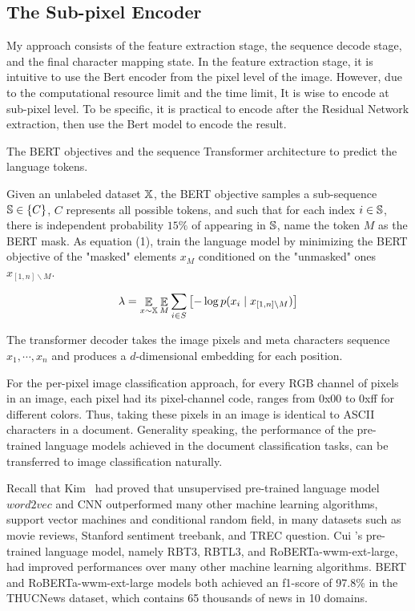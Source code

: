 \documentclass[review]{cvpr}
\begin{document}
\subsection{The Sub-pixel Encoder}

My approach consists of the feature extraction stage, the sequence decode stage, and the final character mapping state.
In the feature extraction stage, it is intuitive to use the Bert encoder from the pixel level of the image.
However, due to the computational resource limit and the time limit,
It is wise to encode at sub-pixel level.
To be specific, it is practical to encode after the Residual Network extraction, then use the Bert model to encode the result.

The BERT objectives and the sequence Transformer architecture to predict the language tokens.

\par Given an unlabeled dataset $\Bbb X$, the BERT objective samples a sub-sequence $\Bbb S \in \{C\}$,
$C$ represents all possible tokens, and such that for each index $i \in \Bbb S$,
there is independent probability $15\%$ of appearing in $\Bbb S$,
name the token $M$ as the BERT mask.
As equation (1), train the language model by minimizing the BERT objective of the "masked" elements $x_M$
conditioned on the "unmasked" ones $x_{\left[1,n\right]\backslash M}$.

\begin{equation}
  \lambda = \mathop{\Bbb E}\limits_{x\sim\Bbb X} \mathop{\Bbb E}\limits_{M} \sum_{i\in S}{\bigl[-\log{p(x_i\mid x_{\left[1,n \right]\backslash M})\bigr]}}
\end{equation}

\par The transformer decoder takes the image pixels and meta characters sequence $x_1,\cdots,x_n$ and produces a $d$-dimensional
embedding for each position.

For the per-pixel image classification approach, for every RGB channel of pixels in an image,
each pixel had its pixel-channel code, ranges from 0x00 to 0xff for different colors.
Thus, taking these pixels in an image is identical to ASCII characters in a document.
Generality speaking, the performance of the pre-trained language models achieved in the document classification tasks, can be transferred to image classification naturally.

\par Recall that Kim~\cite{kim2014convolutional} had proved that unsupervised pre-trained language model $word2vec$ and CNN outperformed many other machine learning algorithms,
\eg support vector machines and conditional random field, in many datasets such as movie reviews, Stanford sentiment treebank, and TREC question.
Cui \etal's pre-trained language model, namely RBT3, RBTL3, and RoBERTa-wwm-ext-large, had improved performances over many other machine learning algorithms.
BERT and RoBERTa-wwm-ext-large models both achieved an f1-score of 97.8\% in the THUCNews dataset, which contains 65 thousands of news in 10 domains.
\end{document}
